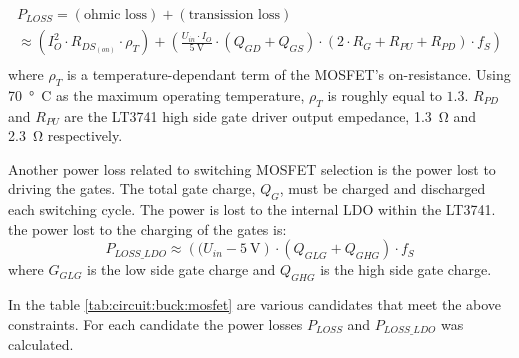 \begin{multline}
    P_{LOSS} = (\textrm{ohmic loss}) + (\textrm{transission loss}) \\
             \approx \left( I_O^2 \cdot R_{DS_{(on)}} \cdot \rho_T \right)
                    + \left( \frac{U_{in} \cdot I_O}{\SI{5}{\volt}} \cdot \left(Q_{GD} + Q_{GS} \right) \cdot \left( 2 \cdot R_G + R_{PU} + R_{PD} \right) \cdot f_S \right) \\
    \label{eq:circuit:buck:mosfet_ploss}
\end{multline}
where  $\rho_T$ is a temperature-dependant term of the  MOSFET's  on-resistance.
Using \SI{70}{\degree C} as the maximum operating temperature, $\rho_T$ is
roughly  equal  to  $1.3$.  $R_{PD}$  and $R_{PU}$ are the LT3741 high side gate
driver   output   empedance,  \SI{1.3}{\ohm}  and  \SI{2.3}{\ohm}  respectively.

Another power loss related to switching MOSFET selection  is  the  power lost to
driving the gates. The total gate  charge, $Q_G$, must be charged and discharged
each switching cycle. The power is lost to the  internal  LDO within the LT3741.
the power lost to the charging of the gates is:
\begin{equation}
    P_{LOSS\_LDO} \approx \left( (U_{in} - \SI{5}{\volt} \right) \cdot \left( Q_{GLG} + Q_{GHG} \right) \cdot f_S
    \label{eq:circuit:buck:switching_loss}
\end{equation}
where $G_{GLG}$ is the low side gate charge  and $Q_{GHG}$ is the high side gate
charge.

In the table \ref{tab:circuit:buck:mosfet} are various candidates  that meet the
above  constraints.  For   each   candidate  the  power  losses  $P_{LOSS}$  and
$P_{LOSS\_LDO}$ was calculated.

